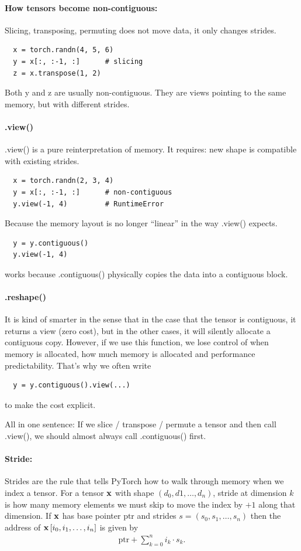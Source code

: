 \documentclass[11pt]{article}  %
\begin{document}
\paragraph{How tensors become non-contiguous:}
Slicing, transposing, permuting does not move data, it only changes strides.
\begin{lstlisting}
  x = torch.randn(4, 5, 6)
  y = x[:, :-1, :]      # slicing
  z = x.transpose(1, 2)
\end{lstlisting}
Both y and z are usually non-contiguous. 
They are views pointing to the same memory, but with different strides.

\paragraph{.view()}
.view() is a pure reinterpretation of memory.
It requires: new shape is compatible with existing strides.
\begin{lstlisting}
  x = torch.randn(2, 3, 4)
  y = x[:, :-1, :]      # non-contiguous
  y.view(-1, 4)         # RuntimeError
\end{lstlisting}
Because the memory layout is no longer ``linear'' in the way .view() expects.
\begin{lstlisting}
  y = y.contiguous()
  y.view(-1, 4)
\end{lstlisting}
works because .contiguous() physically copies the data into a contiguous block.

\paragraph{.reshape()}
It is kind of smarter in the sense that in the case that the tensor is contiguous, it returns a view (zero cost), but in the other cases, it will silently allocate a contiguous copy.
However, if we use this function, we lose control of when memory is allocated, how much memory is allocated and performance predictability.
That's why we often write 
\begin{lstlisting}
  y = y.contiguous().view(...)
\end{lstlisting}
to make the cost explicit.

All in one sentence: If we slice / transpose / permute a tensor and then call .view(), we should almost always call .contiguous() first.

\paragraph{Stride:}
Strides are the rule that tells PyTorch how to walk through memory when we index a tensor.
For a tensor $\mathbf{x}$ with shape $(d_0, d1, \hdots, d_n)$, stride at dimension $k$ is how many memory elements we must skip to move the index by $+1$ along that dimension.
If $\mathbf{x}$ has base pointer $\text{ptr}$ and strides $s = (s_0, s_1, \hdots, s_n)$ then the address of $\mathbf{x}\left[ i_0, i_1, \hdots, i_n \right]$ is given by 
\begin{align*}
  \text{ptr} + \sum_{k=0}^{n}i_k \cdot s_k.
\end{align*}
\end{document}

